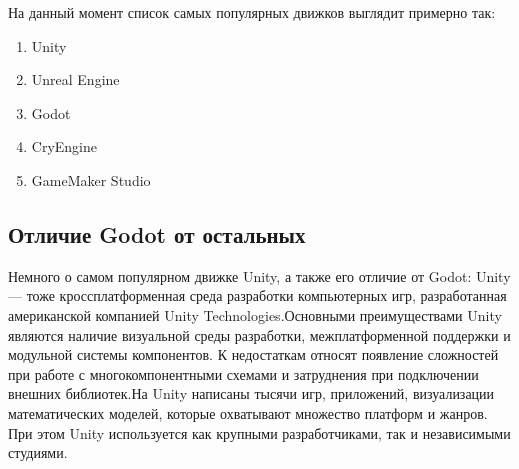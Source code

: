 На данный момент список самых популярных движков выглядит примерно так:
\begin{enumerate}
    \item Unity
    \item Unreal Engine
    \item Godot
    \item CryEngine
    \item GameMaker Studio
\end{enumerate}


\subsection{\label{subsec:ch01/sec01/sub01}Отличие Godot от остальных}
Немного о самом популярном движке Unity, а также его отличие от Godot:
Unity--- тоже кроссплатформенная среда разработки компьютерных игр, разработанная американской компанией Unity Technologies.Основными преимуществами Unity являются наличие визуальной среды разработки, межплатформенной поддержки и модульной системы компонентов. К недостаткам относят появление сложностей при работе с многокомпонентными схемами и затруднения при подключении внешних библиотек.На Unity написаны тысячи игр, приложений, визуализации математических моделей, которые охватывают множество платформ и жанров. При этом Unity используется как крупными разработчиками, так и независимыми студиями.


